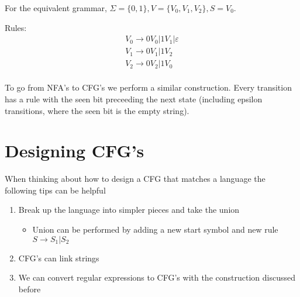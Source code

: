\begin{example}
    \begin{center}
    \end{center}

    For the equivalent grammar, $\Sigma = \{0, 1\}, V = \{ V_0, V_1, V_2 \}, S = V_0$. 

    Rules$:$
    \begin{gather*}
        V_0 \rightarrow 0 V_0 | 1 V_1 | \varepsilon \\
        V_1 \rightarrow 0 V_1 | 1 V_2 \\
        V_2 \rightarrow 0 V_2 | 1 V_0 \\
    \end{gather*}
\end{example}

To go from NFA's to CFG's we perform a similar construction. Every transition has a rule with the seen bit preceeding the next state (including epsilon transitions, where the seen bit is the empty string).

\section{Designing CFG's}
When thinking about how to design a CFG that matches a language the following tips can be helpful
\begin{enumerate}
    \item Break up the language into simpler pieces and take the union
    \begin{itemize}
        \item Union can be performed by adding a new start symbol and new rule $S \rightarrow S_1 | S_2$
    \end{itemize}
    \item CFG's can link strings 
    \item We can convert regular expressions to CFG's with the construction discussed before
\end{enumerate}


